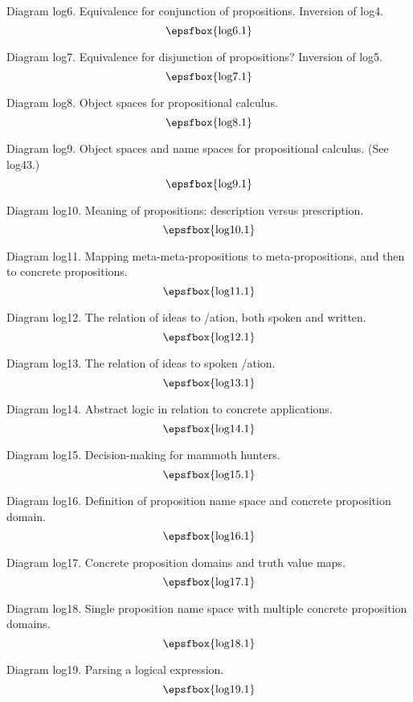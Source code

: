 \filleject

Diagram log6. Equivalence for conjunction of propositions. Inversion of
log4.
$$
\centerline{\epsfbox{log6.1}}
$$

Diagram log7. Equivalence for disjunction of propositions? Inversion of
log5.
$$
\centerline{\epsfbox{log7.1}}
$$

Diagram log8. Object spaces for propositional calculus.
$$
\centerline{\epsfbox{log8.1}}
$$

Diagram log9. Object spaces and name spaces for propositional calculus. (See
log43.)
$$
\centerline{\epsfbox{log9.1}}
$$

\filleject

Diagram log10. Meaning of propositions: description versus prescription.
$$
\centerline{\epsfbox{log10.1}}
$$

Diagram log11. Mapping meta-meta-propositions to meta-propositions, and then to
concrete propositions.
$$
\centerline{\epsfbox{log11.1}}
$$

Diagram log12. The relation of ideas to \verbalis/ation, both spoken and
written.
$$
\centerline{\epsfbox{log12.1}}
$$

Diagram log13. The relation of ideas to spoken \verbalis/ation.
$$
\centerline{\epsfbox{log13.1}}
$$

Diagram log14. Abstract logic in relation to concrete applications.
$$
\centerline{\epsfbox{log14.1}}
$$

\filleject

Diagram log15. Decision-making for mammoth hunters.
$$
\centerline{\epsfbox{log15.1}}
$$

Diagram log16. Definition of proposition name space and concrete proposition
domain.
$$
\centerline{\epsfbox{log16.1}}
$$

Diagram log17. Concrete proposition domains and truth value maps.
$$
\centerline{\epsfbox{log17.1}}
$$

\filleject

Diagram log18. Single proposition name space with multiple concrete proposition
domains.
$$
\centerline{\epsfbox{log18.1}}
$$

Diagram log19. Parsing a logical expression.
$$
\centerline{\epsfbox{log19.1}}
$$

